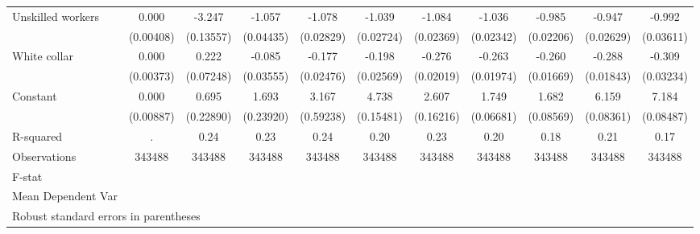 {\begin{tabular}{l*{10}{c}}
Unskilled workers   &       0.000         &      -3.247\sym{***}&      -1.057\sym{***}&      -1.078\sym{***}&      -1.039\sym{***}&      -1.084\sym{***}&      -1.036\sym{***}&      -0.985\sym{***}&      -0.947\sym{***}&      -0.992\sym{***}\\
                    &   (0.00408)         &   (0.13557)         &   (0.04435)         &   (0.02829)         &   (0.02724)         &   (0.02369)         &   (0.02342)         &   (0.02206)         &   (0.02629)         &   (0.03611)         \\
White collar        &       0.000         &       0.222\sym{**} &      -0.085\sym{*}  &      -0.177\sym{***}&      -0.198\sym{***}&      -0.276\sym{***}&      -0.263\sym{***}&      -0.260\sym{***}&      -0.288\sym{***}&      -0.309\sym{***}\\
                    &   (0.00373)         &   (0.07248)         &   (0.03555)         &   (0.02476)         &   (0.02569)         &   (0.02019)         &   (0.01974)         &   (0.01669)         &   (0.01843)         &   (0.03234)         \\
Constant            &       0.000         &       0.695\sym{**} &       1.693\sym{***}&       3.167\sym{***}&       4.738\sym{***}&       2.607\sym{***}&       1.749\sym{***}&       1.682\sym{***}&       6.159\sym{***}&       7.184\sym{***}\\
                    &   (0.00887)         &   (0.22890)         &   (0.23920)         &   (0.59238)         &   (0.15481)         &   (0.16216)         &   (0.06681)         &   (0.08569)         &   (0.08361)         &   (0.08487)         \\
\hline
R-squared           &           .         &        0.24         &        0.23         &        0.24         &        0.20         &        0.23         &        0.20         &        0.18         &        0.21         &        0.17         \\
Observations        &      343488         &      343488         &      343488         &      343488         &      343488         &      343488         &      343488         &      343488         &      343488         &      343488         \\
F-stat              &                     &                     &                     &                     &                     &                     &                     &                     &                     &                     \\
Mean Dependent Var  &                     &                     &                     &                     &                     &                     &                     &                     &                     &                     \\
\hline\hline
\multicolumn{11}{l}{\footnotesize Robust standard errors in parentheses}\\
\end{tabular}
}
